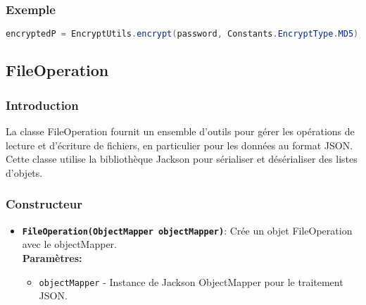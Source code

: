 \documentclass{article}
\begin{document}
\subsubsection{Exemple}
\begin{lstlisting}[language=Java]
encryptedP = EncryptUtils.encrypt(password, Constants.EncryptType.MD5);
\end{lstlisting}
\subsection{FileOperation}
\subsubsection{Introduction}
La classe FileOperation fournit un ensemble d'outils pour gérer les opérations de lecture et d'écriture de fichiers, en particulier pour les données au format JSON. Cette classe utilise la bibliothèque Jackson pour sérialiser et désérialiser des listes d'objets.
\subsubsection{Constructeur}
\begin{itemize}
  \item \textbf{\texttt{FileOperation(ObjectMapper objectMapper)}}: Crée un objet FileOperation avec le objectMapper.\\
  \textbf{Paramètres:}
  \begin{itemize}
    \item \texttt{objectMapper} - Instance de Jackson ObjectMapper pour le traitement JSON.
  \end{itemize}
\end{itemize}
\end{document}
